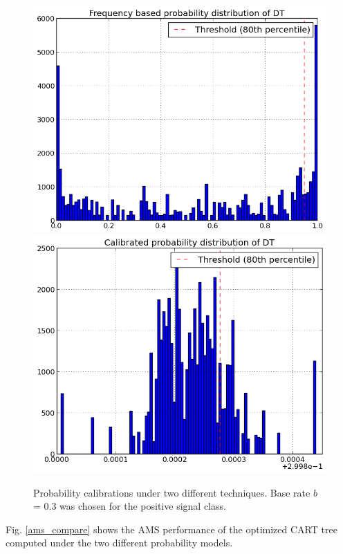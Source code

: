 \documentclass[final,3p,times,twocolumn]{elsarticle}
\begin{document}
\begin{figure}
\hspace{-1cm}
\includegraphics[scale=0.5]{Images/Prob_model.png}
\includegraphics[scale=0.5]{Images/Prob_calib.png}
\caption{Probability calibrations under two different techniques. Base rate $b$ = 0.3 was chosen for the positive signal class.}
\label{prob_compare}
\end{figure}

Fig. \ref{ams_compare} shows the AMS performance of the optimized CART tree computed under the two different probability models. 
\end{document}

